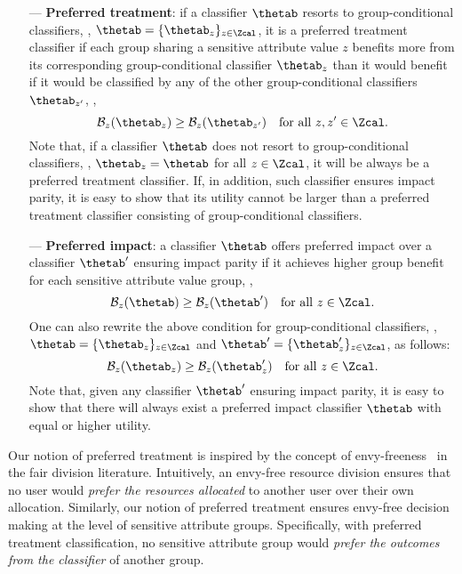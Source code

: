\documentclass{article}
\newcommand{\xhdr}[1]{\vspace{0mm}\noindent{{\bf #1.}}}
\begin{document}
\vspace{-2mm}
\begin{itemize}[leftmargin=6mm]

\item[---] \textbf{Preferred treatment}: if a classifier $\thetab$ resorts to group-conditional classifiers, \ie, $\thetab = \{ \thetab_z \}_{z \in \Zcal}$, it is a preferred treatment classifier if each group sharing a sensitive attribute
value $z$ benefits more from its corresponding group-conditional classifier $\thetab_z$ than it would benefit if it would be classified by any of the other group-conditional classifiers
$\thetab_{z'}$, \ie,
\begin{equation}\label{eq:enf}
\mathcal{B}_{z}(\thetab_z) \geq \mathcal{B}_{z}(\thetab_{z'{}}) \quad \mbox{for all } z, z'{} \in \Zcal.
\end{equation}
Note that, if a classifier $\thetab$ does not resort to group-conditional classifiers, \ie, $\thetab_z = \thetab$ for all $z \in \Zcal$, it will be always be a preferred treatment classifier. If, in addition, such
classifier ensures impact parity, it is easy to show that its utility cannot be larger than a preferred treatment classifier consisting of group-conditional classifiers.

\item[---] \textbf{Preferred impact}: a classifier $\thetab$ offers preferred impact over a classifier $\thetab'{}$ ensuring impact parity if it achieves higher group
benefit for each sensitive attribute value group, \ie,
\begin{equation}
\mathcal{B}_{z}(\thetab) \geq \mathcal{B}_{z}(\thetab') \quad \mbox{for all } z \in \Zcal.
\end{equation}
One can also rewrite the above condition for group-conditional classifiers,
\ie, $\thetab = \{ \thetab_z \}_{z \in \Zcal}$ and
$\thetab'{} = \{\thetab_z'{} \}_{z \in \Zcal}$, as follows:
\begin{equation} \label{eq:pref-gc}
\mathcal{B}_{z}(\thetab_z) \geq \mathcal{B}_{z}(\thetab_z'{}) \quad \mbox{for all } z \in \Zcal.
\end{equation}
Note that, given any classifier $\thetab'{}$ ensuring impact parity, it is easy to show that there will always exist a preferred impact classifier $\thetab$ with equal or higher utility.


\end{itemize}






\xhdr{Connection to the fair division literature}
Our notion of preferred treatment is inspired by the concept of
envy-freeness~\cite{berliant_envy,varian_envy} in the fair division
literature. Intuitively, an envy-free resource division ensures that
no user would \emph{prefer the resources allocated} to another user
over their own allocation. Similarly, our notion of preferred
treatment ensures envy-free decision making at the level of sensitive
attribute groups. Specifically, with preferred treatment classification,
no sensitive attribute group would \emph{prefer the outcomes from the
  classifier} of another group.
\end{document}
